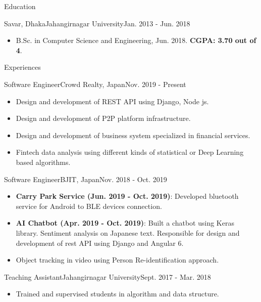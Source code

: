 \documentclass[]{mcdowellcv}
\def\first{8pt}
\begin{document}
	\makeheader
	
	\begin{cvsection}{Education}
		\begin{cvsubsection}{\hspace*{\first}Savar, Dhaka}{Jahangirnagar University}{Jan. 2013 - Jun. 2018}
		    \vspace{2pt}			
			\begin{itemize}
			    \item B.Sc. in Computer Science and Engineering, Jun. 2018. \textbf{CGPA: 3.70 out of 4}.	
			\end{itemize}
		\end{cvsubsection}
	\end{cvsection}
	
	\begin{cvsection}{Experiences}
		\begin{cvsubsection}{\hspace*{\first}Software Engineer}{Crowd Realty, Japan}{Nov. 2019 - Present}	
			\begin{itemize}
			     \item Design and development of REST API using Django, Node js.
			     \item Design and development of P2P platform infrastructure.
			     \item Design and development of business system specialized in financial services.
			     \item Fintech data analysis using different kinds of statistical or Deep Learning  based algorithms.
			\end{itemize}
		\end{cvsubsection}
	   \begin{cvsubsection}{\hspace*{\first}Software Engineer}{BJIT, Japan}{Nov. 2018 - Oct. 2019}
			\begin{itemize}
			     \item \textbf{Carry Park Service (Jun. 2019 - Oct. 2019)}: Developed bluetooth service for Android to BLE devices connection.
				\item \textbf{AI Chatbot (Apr. 2019 - Oct. 2019)}: Built a chatbot using Keras library. Sentiment analysis on Japanese text. Responsible for design and development of  rest API using Django and Angular 6.
				\item Object tracking  in video using Person Re-identification approach.
			\end{itemize}
		\end{cvsubsection}
		\begin{cvsubsection}{\hspace*{\first}Teaching Assistant}{Jahangirnagar University}{Sept. 2017 - Mar. 2018}			
			\begin{itemize}
				\item Trained and supervised students in algorithm and data structure. 
			\end{itemize}
		\end{cvsubsection}
	\end{cvsection}
	
\end{document}
